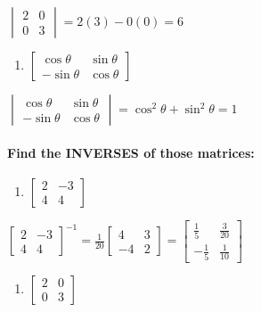 \documentclass[
  letterpaper,
  DIV=11,
  numbers=noendperiod]{scrartcl}
\let\oldparagraph\paragraph
\renewcommand{\paragraph}[1]{\oldparagraph{#1}\mbox{}}
\providecommand{\tightlist}{%
  \setlength{\itemsep}{0pt}\setlength{\parskip}{0pt}}\usepackage{longtable,booktabs,array}
\begin{document}
\(\begin{vmatrix}2 & 0 \\ 0 & 3 \end{vmatrix} = 2(3)-0(0) = 6\)

\begin{enumerate}
\def\labelenumi{\arabic{enumi})}
\setcounter{enumi}{2}
\tightlist
\item
  \(\begin{bmatrix}\cos\theta & \sin\theta \\ -\sin\theta & \cos\theta \end{bmatrix}\)
\end{enumerate}

\(\begin{vmatrix}\cos\theta & \sin\theta \\ -\sin\theta & \cos\theta \end{vmatrix} = \cos^2\theta + \sin^2\theta = 1\)

\paragraph{Find the INVERSES of those
matrices:}\label{find-the-inverses-of-those-matrices}

\begin{enumerate}
\def\labelenumi{\arabic{enumi})}
\tightlist
\item
  \(\begin{bmatrix}2 & -3 \\ 4 & 4 \end{bmatrix}\)
\end{enumerate}

\(\begin{bmatrix}2 & -3 \\ 4 & 4 \end{bmatrix}^{-1} = \frac{1}{20}\begin{bmatrix}4 & 3 \\ -4 & 2 \end{bmatrix}=\begin{bmatrix}\frac{1}{5} & \frac{3}{20} \\ -\frac{1}{5} & \frac{1}{10}\end{bmatrix}\)

\begin{enumerate}
\def\labelenumi{\arabic{enumi})}
\setcounter{enumi}{1}
\tightlist
\item
  \(\begin{bmatrix}2 & 0 \\ 0 & 3 \end{bmatrix}\)
\end{enumerate}
\end{document}
